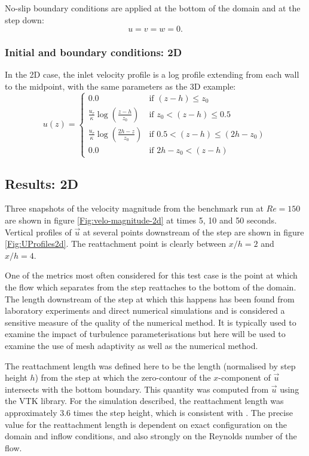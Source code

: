 No-slip boundary conditions are applied at the bottom of the domain and at the step down:
\begin{equation*}
u=v=w=0.
\end{equation*}

\subsubsection{Initial and boundary conditions: 2D}
In the 2D case, the inlet velocity profile is a log profile extending from each wall to the midpoint, with the same parameters as the 3D example:
\begin{equation*}
u(z) =
  \begin{cases}
    0.0 & \text{if } (z-h) \leq z_0 \\
    \frac{u_{\tau}}{\kappa} \log \left(\frac{z - h}{z_0}\right) & \text{if } z_0 < (z-h) \leq 0.5 \\
    \frac{u_{\tau}}{\kappa} \log \left(\frac{2h - z}{z_0}\right) & \text{if } 0.5 < (z-h) \leq (2h-z_0) \\
    0.0 & \text{if } 2h-z_0 < (z-h)
  \end{cases}
\end{equation*}


\subsection{Results: 2D}
Three snapshots of the velocity magnitude from the benchmark run at $Re=150$
are shown in figure \ref{Fig:velo-magnitude-2d} at times 5, 10 and 50 seconds.
Vertical profiles of $\vec{u}$ at several points downstream of the step are shown
in figure \ref{Fig:UProfiles2d}. The reattachment point is clearly between $x/h=2$ and $x/h=4$.

One of the metrics most often considered for this test case is the point at which the
flow which separates from the step reattaches to the bottom of the domain.
The length downstream of the step at which this happens
has been found from laboratory experiments and direct numerical simulations and is considered a
sensitive measure of the quality of the numerical method. It is typically used to examine the impact
of turbulence parameterisations but here will be used to examine the use of mesh adaptivity
as well as the numerical method.

The reattachment length was defined here to be the length (normalised by step height $h$)
from the step at which the zero-contour of the $x$-component of $\vec{u}$ intersects with
the bottom boundary. This quantity was computed from $\vec{u}$
using the VTK library. For the simulation described, the reattachment
length was approximately 3.6 times the step height, which is consistent with \cite{armaly1983}.
The precise value for the reattachment length is dependent on exact configuration on the domain and inflow
conditions, and also strongly on the Reynolds number of the flow.

